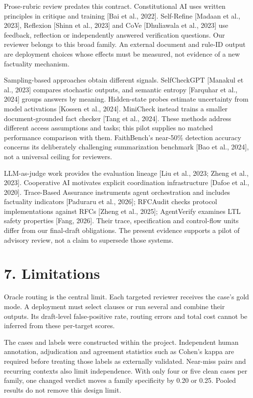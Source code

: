 \documentclass[
  10pt,
  a4paper,
]{article}
\begin{document}
Prose-rubric review predates this contract. Constitutional AI uses
written principles in critique and training {[}Bai et al., 2022{]}.
Self-Refine {[}Madaan et al., 2023{]}, Reflexion {[}Shinn et al.,
2023{]} and CoVe {[}Dhuliawala et al., 2023{]} use feedback, reflection
or independently answered verification questions. Our reviewer belongs
to this broad family. An external document and rule-ID output are
deployment choices whose effects must be measured, not evidence of a new
factuality mechanism.

Sampling-based approaches obtain different signals. SelfCheckGPT
{[}Manakul et al., 2023{]} compares stochastic outputs, and semantic
entropy {[}Farquhar et al., 2024{]} groups answers by meaning.
Hidden-state probes estimate uncertainty from model activations
{[}Kossen et al., 2024{]}. MiniCheck instead trains a smaller
document-grounded fact checker {[}Tang et al., 2024{]}. These methods
address different access assumptions and tasks; this pilot supplies no
matched performance comparison with them. FaithBench's near-50\%
detection accuracy concerns its deliberately challenging summarization
benchmark {[}Bao et al., 2024{]}, not a universal ceiling for reviewers.

LLM-as-judge work provides the evaluation lineage {[}Liu et al., 2023;
Zheng et al., 2023{]}. Cooperative AI motivates explicit coordination
infrastructure {[}Dafoe et al., 2020{]}. Trace-Based Assurance
instruments agent orchestration and includes factuality indicators
{[}Paduraru et al., 2026{]}; RFCAudit checks protocol implementations
against RFCs {[}Zheng et al., 2025{]}; AgentVerify examines LTL safety
properties {[}Fang, 2026{]}. Their trace, specification and control-flow
units differ from our final-draft obligations. The present evidence
supports a pilot of advisory review, not a claim to supersede those
systems.

\section{7. Limitations}\label{limitations}

Oracle routing is the central limit. Each targeted reviewer receives the
case's gold mode. A deployment must select clauses or run several and
combine their outputs. Its draft-level false-positive rate, routing
errors and total cost cannot be inferred from these per-target scores.

The cases and labels were constructed within the project. Independent
human annotation, adjudication and agreement statistics such as Cohen's
kappa are required before treating those labels as externally validated.
Near-miss pairs and recurring contexts also limit independence. With
only four or five clean cases per family, one changed verdict moves a
family specificity by 0.20 or 0.25. Pooled results do not remove this
design limit.
\end{document}
